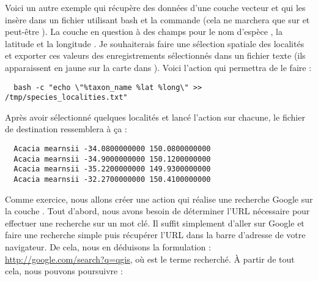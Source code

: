 Voici un autre exemple qui récupère des données d'une couche vecteur et qui les insère dans un fichier utilisant bash et la commande  (cela ne marchera que sur \nix et peut-être \osx). La couche en question à des champs pour le nom d'espèce , la latitude  et la longitude . Je souhaiterais faire une sélection spatiale des localités et exporter ces valeurs des enregistrements sélectionnés dans un fichier texte (ils apparaissent en jaune sur la carte dans \qg). Voici l'action qui permettra de le faire :

\begin{verbatim}
  bash -c "echo \"%taxon_name %lat %long\" >> /tmp/species_localities.txt"
\end{verbatim}

Après avoir sélectionné quelques localités et lancé l'action sur chacune, le fichier de destination ressemblera à ça :

\begin{verbatim}
  Acacia mearnsii -34.0800000000 150.0800000000
  Acacia mearnsii -34.9000000000 150.1200000000
  Acacia mearnsii -35.2200000000 149.9300000000
  Acacia mearnsii -32.2700000000 150.4100000000
\end{verbatim}

Comme exercice, nous allons créer une action qui réalise une recherche Google sur la couche . Tout d'abord, nous avons besoin de déterminer l'URL nécessaire pour effectuer une recherche sur un mot clé. Il suffit simplement d'aller sur Google et faire une recherche simple puis récupérer l'URL dans la barre d'adresse de votre navigateur. De cela, nous en déduisons la formulation : \url{http://google.com/search?q=qgis}, où  est le terme recherché. À partir de tout cela, nous pouvons poursuivre :

